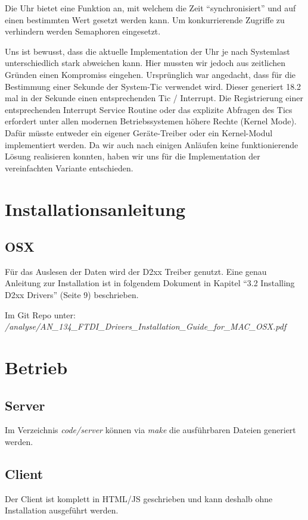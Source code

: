 Die Uhr bietet eine Funktion an, mit welchem die Zeit "`synchronisiert"' und auf einen bestimmten Wert gesetzt werden kann. Um konkurrierende Zugriffe zu verhindern werden Semaphoren eingesetzt.

Uns ist bewusst, dass die aktuelle Implementation der Uhr je nach Systemlast unterschiedlich stark abweichen kann. Hier mussten wir jedoch aus zeitlichen Gründen einen Kompromiss eingehen. Ursprünglich war angedacht, dass für die Bestimmung einer Sekunde der System-Tic verwendet wird. Dieser generiert 18.2 mal in der Sekunde einen entsprechenden Tic / Interrupt. Die Registrierung einer entsprechenden Interrupt Service Routine oder das explizite Abfragen des Tics erfordert unter allen modernen Betriebssystemen höhere Rechte (Kernel Mode). Dafür müsste entweder ein eigener Geräte-Treiber oder ein Kernel-Modul implementiert werden. Da wir auch nach einigen Anläufen keine funktionierende Lösung realisieren konnten, haben wir uns für die Implementation der vereinfachten Variante entschieden.

\section{Installationsanleitung}
\subsection{OSX}
Für das Auslesen der Daten wird der D2xx Treiber genutzt. Eine genau Anleitung zur Installation ist in folgendem Dokument in Kapitel "`3.2 Installing D2xx Drivers"' (Seite 9) beschrieben.

Im Git Repo unter:\\
\textit{/analyse/AN\_134\_FTDI\_Drivers\_Installation\_Guide\_for\_MAC\_OSX.pdf}


\section{Betrieb}
\subsection{Server}
Im Verzeichnis \textit{code/server} können via \textit{make} die ausführbaren Dateien generiert werden.

\subsection{Client}
Der Client ist komplett in HTML/JS geschrieben und kann deshalb ohne Installation ausgeführt werden.

